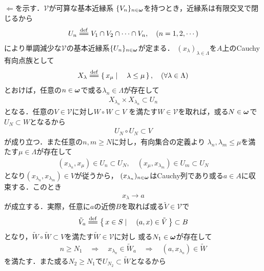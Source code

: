 	\begin{prf}
		$\Longleftarrow$を示す．$\mathscr{V}$が可算な基本近縁系
		$\{V_n\}_{n \in {\boldsymbol \omega}}$を持つとき，近縁系は有限交叉で閉じるから
		\begin{align}
			U_n \defeq V_1 \cap V_2 \cap \cdots \cap V_n,
			\quad (n = 1,2,\cdots)
		\end{align}
		により単調減少な$\mathscr{V}$の基本近縁系$\{U_n\}_{n \in {\boldsymbol \omega}}$が定まる．
		$(x_\lambda)_{\lambda \in \Lambda}$を$A$上のCauchy有向点族として
		\begin{align}
			X_\lambda \defeq \Set{x_\mu}{\lambda \leq \mu},
			\quad (\forall \lambda \in \Lambda)
		\end{align}
		とおけば，任意の$n \in {\boldsymbol \omega}$で或る$\lambda_n \in \Lambda$が存在して
		\begin{align}
			X_{\lambda_n} \times X_{\lambda_n} \subset U_n
		\end{align}
		となる．任意の$V \in \mathscr{V}$に対し$W \circ W \subset V$
		を満たす$W \in \mathscr{V}$を取れば，或る$N \in {\boldsymbol \omega}$で$U_N \subset W$となるから
		\begin{align}
			U_N \circ U_N \subset V
		\end{align}
		が成り立つ．また任意の$n,m \geq N$に対し，有向集合の定義より
		$\lambda_n,\lambda_m \leq \mu$を満たす$\mu \in \Lambda$が存在して
		\begin{align}
			(x_{\lambda_n},x_\mu) \in U_n \subset U_N,
			\quad (x_\mu, x_{\lambda_m}) \in U_m \subset U_N
		\end{align}
		となり$(x_{\lambda_n},x_{\lambda_m}) \in V$が従うから，
		$(x_{\lambda_n})_{n \in {\boldsymbol \omega}}$はCauchy列であり或る$a \in A$に収束する．このとき
		\begin{align}
			x_\lambda \longrightarrow a
			\label{eq:thm_complete_iff_every_Cauchy_seq_converges_if_entourage_contains_some_countable_subset}
		\end{align}
		が成立する．実際，任意に$a$の近傍$B$を取れば或る$\tilde{V} \in \mathscr{V}$で
		\begin{align}
			\tilde{V}_a \defeq \Set{x \in S}{(a,x) \in \tilde{V}} \subset B
		\end{align}
		となり，$\tilde{W} \circ \tilde{W} \subset V$を満たす$\tilde{W} \in \mathscr{V}$に対し
		或る$N_1 \in {\boldsymbol \omega}$が存在して
		\begin{align}
			n \geq N_1 \quad \Longrightarrow \quad
			x_{\lambda_n} \in \tilde{W}_a \quad \Longrightarrow \quad
			(a,x_{\lambda_n}) \in \tilde{W}
		\end{align}
		を満たす．また或る$N_2 \geq N_1$で$U_{N_2} \subset \tilde{W}$となるから

\end{prf}
